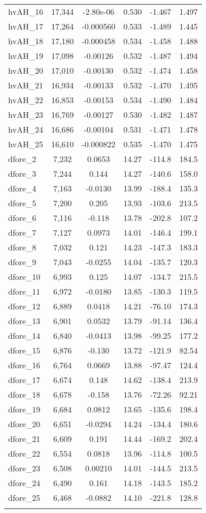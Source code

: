 \begin{tabular}{lccccc}
hvAH\_16 & 17,344 & -2.80e-06 & 0.530 & -1.467 & 1.497 \\
hvAH\_17 & 17,264 & -0.000560 & 0.533 & -1.489 & 1.445 \\
hvAH\_18 & 17,180 & -0.000458 & 0.534 & -1.458 & 1.488 \\
hvAH\_19 & 17,098 & -0.00126 & 0.532 & -1.487 & 1.494 \\
hvAH\_20 & 17,010 & -0.00130 & 0.532 & -1.474 & 1.458 \\
hvAH\_21 & 16,934 & -0.00133 & 0.532 & -1.470 & 1.495 \\
hvAH\_22 & 16,853 & -0.00153 & 0.534 & -1.490 & 1.484 \\
hvAH\_23 & 16,769 & -0.00127 & 0.530 & -1.482 & 1.487 \\
hvAH\_24 & 16,686 & -0.00104 & 0.531 & -1.471 & 1.478 \\
hvAH\_25 & 16,610 & -0.000822 & 0.535 & -1.470 & 1.475 \\
dfore\_2 & 7,232 & 0.0653 & 14.27 & -114.8 & 184.5 \\
dfore\_3 & 7,244 & 0.144 & 14.27 & -140.6 & 158.0 \\
dfore\_4 & 7,163 & -0.0130 & 13.99 & -188.4 & 135.3 \\
dfore\_5 & 7,200 & 0.205 & 13.93 & -103.6 & 213.5 \\
dfore\_6 & 7,116 & -0.118 & 13.78 & -202.8 & 107.2 \\
dfore\_7 & 7,127 & 0.0973 & 14.01 & -146.4 & 199.1 \\
dfore\_8 & 7,032 & 0.121 & 14.23 & -147.3 & 183.3 \\
dfore\_9 & 7,043 & -0.0255 & 14.04 & -135.7 & 120.3 \\
dfore\_10 & 6,993 & 0.125 & 14.07 & -134.7 & 215.5 \\
dfore\_11 & 6,972 & -0.0180 & 13.85 & -130.3 & 119.5 \\
dfore\_12 & 6,889 & 0.0418 & 14.21 & -76.10 & 174.3 \\
dfore\_13 & 6,901 & 0.0532 & 13.79 & -91.14 & 136.4 \\
dfore\_14 & 6,840 & -0.0413 & 13.98 & -99.25 & 177.2 \\
dfore\_15 & 6,876 & -0.130 & 13.72 & -121.9 & 82.54 \\
dfore\_16 & 6,764 & 0.0669 & 13.88 & -97.47 & 124.4 \\
dfore\_17 & 6,674 & 0.148 & 14.62 & -138.4 & 213.9 \\
dfore\_18 & 6,678 & -0.158 & 13.76 & -72.26 & 92.21 \\
dfore\_19 & 6,684 & 0.0812 & 13.65 & -135.6 & 198.4 \\
dfore\_20 & 6,651 & -0.0294 & 14.24 & -134.4 & 180.6 \\
dfore\_21 & 6,609 & 0.191 & 14.44 & -169.2 & 202.4 \\
dfore\_22 & 6,554 & 0.0818 & 13.96 & -114.8 & 100.5 \\
dfore\_23 & 6,508 & 0.00210 & 14.01 & -144.5 & 213.5 \\
dfore\_24 & 6,490 & 0.161 & 14.18 & -143.5 & 185.2 \\
dfore\_25 & 6,468 & -0.0882 & 14.10 & -221.8 & 128.8 \\
 &  &  &  &  &  \\ \hline
\end{tabular}
